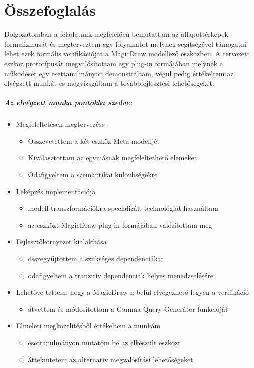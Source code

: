 \chapter{Összefoglalás}
\label{chap:osszefoglalas}
Dolgozatomban a feladatnak megfelelően bemutattam az állapottérképek formalizmusát és megterveztem egy folyamatot melynek segítségével támogatni lehet ezek formális verifikációját a MagicDraw modellező eszközben. A tervezett eszköz prototípusát megvalósítottam egy plug-in formájában melynek a működését egy esettanulmányon demonstráltam, végül pedig értékeltem az elvégzett munkát és megvizsgáltam a továbbfejlesztési lehetőségeket.

\paragraph{Az elvégzett munka pontokba szedve:}

\begin{itemize}
	\item Megfeleltetések megtervezése
	\begin{itemize}
		\item Összevetettem a két eszköz Meta-modelljét
		\item Kiválasztottam az egymásnak megfeleltethető elemeket
		\item Odafigyeltem a szemantikai különbségekre
	\end{itemize}
	\item Leképzés implementációja
		\begin{itemize}
		\item modell transzformációkra specializált technológiát használtam
		\item az eszközt MagicDraw plug-in formájában valósítottam meg
	\end{itemize}
	\item Fejlesztőkörnyezet kialakítása
		\begin{itemize}
			\item összegyűjtöttem a szükséges dependenciákat
			\item odafigyeltem a tranzitív dependenciák helyes menedzselésére
		\end{itemize}
	\item Lehetővé tettem, hogy a MagicDraw-n belül elvégezhető legyen a verifikáció
			\begin{itemize}
			\item átvettem és módosítottam a Gamma Query Generátor funkcióját
		\end{itemize}

	\item Elméleti megközelítésből értékeltem a munkám
		\begin{itemize}
			\item esettanulmányon mutatom be az elkészült eszközt
			\item áttekintetem az alternatív megvalósítási lehetőségeket
		\end{itemize}
	
\end{itemize}

